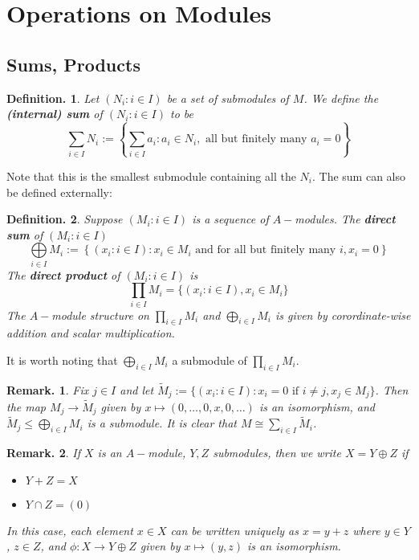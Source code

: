 \documentclass[11pt, a4paper]{memoir}
\theoremstyle{change}
\theoremstyle{plain}
\theoremstyle{nonumberplain}
\newtheorem{definition}{Definition.}
\newtheorem{remark}{Remark.}
\numberwithin{equation}{section}
\begin{document}
\section{Operations on Modules}
\subsection{Sums, Products}
\begin{definition}
    Let $(N_i:i\in I)$ be a set of submodules of $M$.
    We define the \textbf{(internal) sum} of $(N_i:i\in I)$ to be
    \begin{equation*}
        \sum\limits_{i\in I}N_i:=\left\{\sum\limits_{i\in I}a_i:a_i\in N_i,\text{ all but finitely many }a_i=0\right\}
    \end{equation*}
\end{definition}
Note that this is the smallest submodule containing all the $N_i$.
The sum can also be defined externally:
\begin{definition}
    Suppose $(M_i:i\in I)$ is a sequence of $A-$modules.
    The \textbf{direct sum} of $(M_i:i\in I)$
    \begin{equation*}
        \bigoplus\limits_{i\in I}M_i:=\left\{(x_i:i\in I):x_i\in M_i\text{ and for all but finitely many }i,x_i=0\right\}
    \end{equation*}
    The \textbf{direct product} of $(M_i:i\in I)$ is
    \begin{equation*}
        \prod\limits_{i\in I}M_i=\{(x_i:i\in I),x_i\in M_i\}
    \end{equation*}
    The $A-$module structure on $\prod_{i\in I}M_i$ and $\bigoplus_{i\in I}M_i$ is given by corordinate-wise addition and scalar multiplication.
\end{definition}
It is worth noting that $\bigoplus_{i\in I}M_i$ a submodule of $\prod_{i\in I}M_i$.
\begin{remark}
    Fix $j\in I$ and let $\widetilde M_j:=\{(x_i:i\in I):x_i=0\text{ if }i\neq j,x_j\in M_j\}$.
    Then the map $M_j\to \widetilde M_j$ given by $x\mapsto(0,\ldots,0,x,0,\ldots)$ is an isomorphism, and $\widetilde M_j\leq\bigoplus_{i\in I}M_i$ is a submodule.
    It is clear that $M\cong\sum_{i\in I}\widetilde M_i$.
\end{remark}
\begin{remark}
    If $X$ is an $A-$module, $Y,Z$ submodules, then we write $X=Y\oplus Z$ if
    \begin{itemize}[nolistsep]
        \item $Y+Z=X$
        \item $Y\cap Z=(0)$
    \end{itemize}
    In this case, each element $x\in X$ can be written uniquely as $x=y+z$ where $y\in Y$, $z\in Z$, and $\phi:X\to Y\oplus Z$ given by $x\mapsto(y,z)$ is an isomorphism.
\end{remark}
\end{document}
